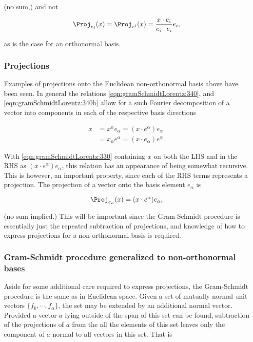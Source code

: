 (no sum,) and not 

\begin{equation}\label{eqn:gramSchmidtLorentz:960}
\Proj_{e_i}(x) = \Proj_{e^i}(x) = \frac{x \cdot e_i}{e_i \cdot e_i} e_i,
\end{equation}

as is the case for an orthonormal basis.

\subsubsection{Projections}

Examples of projections onto the Euclidean non-orthonormal basis above have been seen.  In general the relations \ref{eqn:gramSchmidtLorentz:340}, and \ref{eqn:gramSchmidtLorentz:340b} allow for a such Fourier decomposition of a vector into components in each of the respective basis directions

\begin{equation}\label{eqn:gramSchmidtLorentz:330}
\begin{aligned}
x &= x^\alpha e_\alpha = (x \cdot e^\alpha) e_\alpha \\
  &= x_\alpha e^\alpha = (x \cdot e_\alpha) e^\alpha.
\end{aligned}
\end{equation}

With \ref{eqn:gramSchmidtLorentz:330} containing $x$ on both the LHS and in the RHS as $(x \cdot e^\alpha) e_\alpha$, this relation has an appearance of being somewhat recursive.  This is however, an important property, since each of the RHS terms represents a projection.  The projection of a vector onto the basis element $e_\alpha$ is

\begin{equation}\label{eqn:gramSchmidtLorentz:560}
\Proj_{e_\alpha}(x) = (x \cdot e^\alpha) e_\alpha,
\end{equation}

(no sum implied.)  
This will be important since the Gram-Schmidt procedure is essentially just the repeated subtraction of projections, and knowledge of how to express projections for a non-orthonormal basis is required.

\subsubsection{Gram-Schmidt procedure generalized to non-orthonormal bases}

Aside for some additional care required to express projections, the Gram-Schmidt procedure is the same as in Euclidean space.
Given a set of mutually normal unit vectors $\{f_0, \cdots, f_\alpha\}$, the set may be extended by an additional normal vector.  Provided a vector $a$ lying outside of the span of this set can be found, subtraction of the projections of $a$ from the all the elements of this set leaves only the component of $a$ normal to all vectors in this set.  That is

